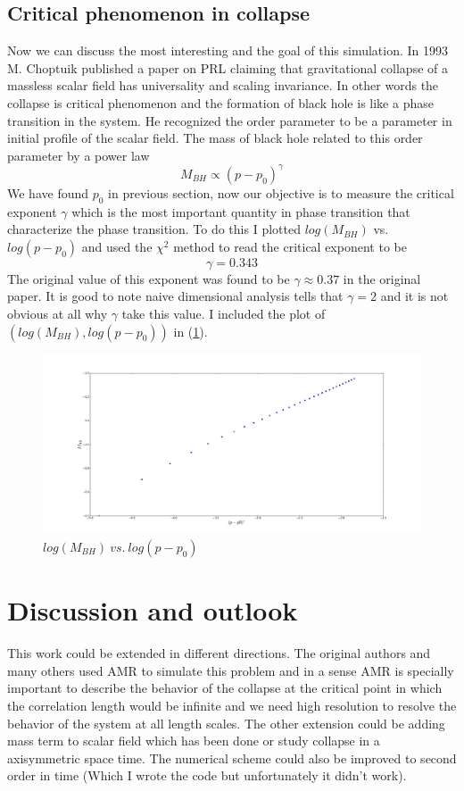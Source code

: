 \documentclass[a4paper,11pt]{article}
\begin{document}
\subsection{Critical phenomenon in collapse}  
Now we can discuss the most interesting and the goal of this simulation. In 1993 M. Choptuik published a paper on PRL claiming that gravitational collapse of a massless scalar field has universality and scaling invariance. In other words the collapse is critical phenomenon and the formation of black hole is like a phase transition in the system. He recognized the order parameter to be a parameter in initial profile of the scalar field. The mass of black hole related to this order parameter by a power law
\begin{equation}
	M_{BH}\propto (p-p_0)^\gamma
\end{equation}
We have found $p_0$ in previous section, now our objective is to measure the critical exponent $\gamma$ which is the most important quantity in phase transition that characterize the phase transition. To do this I plotted $log(M_{BH})$ vs. $log(p-p_0)$ and used the $\chi^2$ method to read the critical exponent to be 
\begin{equation}
	\boxed{\gamma=0.343}
\end{equation}  
The original value of this exponent was found to be $\gamma\approx 0.37$ in the original paper. It is good to note naive dimensional analysis tells that $\gamma=2$ and it is not obvious at all why $\gamma$ take this value. I included the plot of $(log(M_{BH}),log(p-p_0))$ in (\ref{fig5}).
\begin{figure}[H]
	\centering
	\includegraphics[width=\textwidth]{crit.pdf}
	\caption{$log(M_{BH})~vs.~log(p-p_0)$\label{fig5}}
\end{figure}
\section{Discussion and outlook}
This work could be extended in different directions. The original authors and many others used AMR to simulate this problem and in a sense AMR is specially important to describe the behavior of the collapse at the critical point in which the correlation length would be infinite and we need high resolution to resolve the behavior of the system at all length scales. The other extension could be adding mass term to scalar field which has been done or study collapse in a axisymmetric space time. The numerical scheme could also be improved to second order in time (Which I wrote the code but unfortunately it didn't work).  
 
\end{document}
